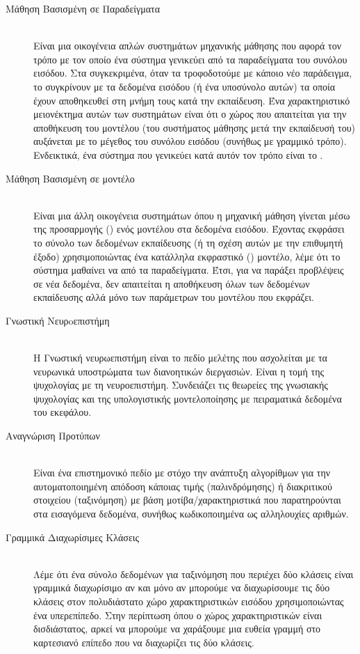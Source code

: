 \begin{description}
    \item[Μάθηση Βασισμένη σε Παραδείγματα] \hfill \\ Είναι μια οικογένεια απλών συστημάτων μηχανικής μάθησης που αφορά τον τρόπο με τον οποίο ένα σύστημα γενικεύει από τα παραδείγματα του συνόλου εισόδου. Στα συγκεκριμένα, όταν τα τροφοδοτούμε με κάποιο νέο παράδειγμα, το συγκρίνουν με τα δεδομένα εισόδου (ή ένα υποσύνολο αυτών) τα οποία έχουν αποθηκευθεί στη μνήμη τους κατά την εκπαίδευση. Ένα χαρακτηριστικό μειονέκτημα αυτών των συστημάτων είναι ότι ο χώρος που απαιτείται για την αποθήκευση του μοντέλου (του συστήματος μάθησης μετά την εκπαίδευσή του) αυξάνεται με το μέγεθος του συνόλου εισόδου (συνήθως με γραμμικό τρόπο). Ενδεικτικά, ένα σύστημα που γενικεύει κατά αυτόν τον τρόπο είναι το .
    
    \item[Μάθηση Βασισμένη σε μοντέλο] \hfill \\ Είναι μια άλλη οικογένεια συστημάτων όπου η μηχανική μάθηση γίνεται μέσω της προσαρμογής () ενός μοντέλου στα δεδομένα εισόδου. Έχοντας εκφράσει το σύνολο των δεδομένων εκπαίδευσης (ή τη σχέση αυτών με την επιθυμητή έξοδο) χρησιμοποιώντας ένα κατάλληλα εκφραστικό () μοντέλο, λέμε ότι το σύστημα μαθαίνει να  από τα παραδείγματα. Έτσι, για να παράξει προβλέψεις σε νέα δεδομένα, δεν απαιτείται η αποθήκευση όλων των δεδομένων εκπαίδευσης αλλά μόνο των παράμετρων του μοντέλου που εκφράζει.

    \item[Γνωστική Νευρoεπιστήμη] \hfill \\ Η Γνωστική νευρωεπιστήμη είναι το πεδίο μελέτης που ασχολείται με τα νευρωνικά υποστρώματα των διανοητικών διεργασιών. Είναι η τομή της ψυχολογίας με τη νευροεπιστήμη. Συνδειάζει τις θεωρείες της γνωσιακής ψυχολογίας και της υπολογιστικής μοντελοποίησης με πειραματικά δεδομένα του εκεφάλου.
    
    \item[Αναγνώριση Προτύπων] \hfill \\ Είναι ένα επιστημονικό πεδίο με στόχο την ανάπτυξη αλγορίθμων για την αυτοματοποιημένη απόδοση κάποιας τιμής (παλινδρόμησης) ή διακριτικού στοιχείου (ταξινόμηση) με βάση μοτίβα/χαρακτηριστικά που παρατηρούνται στα εισαγόμενα δεδομένα, συνήθως κωδικοποιημένα ως αλληλουχίες αριθμών.  
    \item[Γραμμικά Διαχωρίσιμες Κλάσεις] \hfill \\ Λέμε ότι ένα σύνολο δεδομένων για ταξινόμηση που περιέχει δύο κλάσεις είναι γραμμικά διαχωρίσιμο αν και μόνο αν μπορούμε να διαχωρίσουμε τις δύο κλάσεις στον πολυδιάστατο χώρο χαρακτηριστικών εισόδου χρησιμοποιώντας ένα υπερεπίπεδο. Στην περίπτωση όπου ο χώρος χαρακτηριστικών είναι δισδιάστατος, αρκεί να μπορούμε να χαράξουμε μια ευθεία γραμμή στο καρτεσιανό επίπεδο που να διαχωρίζει τις δύο κλάσεις.
    

\end{description}
